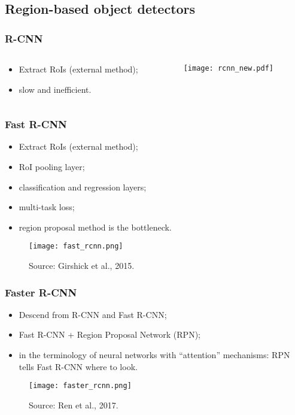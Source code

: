 \documentclass{beamer}
\begin{document}
		\subsection{Region-based object detectors}

		\begin{frame}\frametitle{R-CNN}
			\begin{columns}
				\begin{column}{0.5\textwidth}
					\begin{itemize}
						\item Extract RoIs (external method);
						\item slow and inefficient.
					\end{itemize}
				\end{column}
				\begin{column}{0.5\textwidth}
					\begin{figure}[th!]
						\centering
						\texttt{[image: rcnn\_new.pdf]}
						\label{fig:R-CNN}
					\end{figure}
				\end{column}
			\end{columns}
		\end{frame}



		\begin{frame}\frametitle{Fast R-CNN}
			\begin{itemize}
				\item Extract RoIs (external method);
				\item RoI pooling layer;
				\item classification and regression layers;
				\item multi-task loss;
				\item region proposal method is the bottleneck.
			\end{itemize}
			\begin{figure}[th!]
				\centering
				\texttt{[image: fast\_rcnn.png]}
				\caption{Source: {Girshick et al., 2015}.
				}
				\label{fig:Fast_R-CNN}
			\end{figure}
		\end{frame}


		\begin{frame}\frametitle{Faster R-CNN}
			\begin{itemize}
				\item Descend from R-CNN and Fast R-CNN;
				\item Fast R-CNN + Region Proposal Network (RPN);
				\item in the terminology of neural networks with “attention” mechanisms:
				RPN tells Fast R-CNN where to look.
			\end{itemize}
			\begin{figure}[th!]
				\centering
				\texttt{[image: faster\_rcnn.png]}
				\caption{Source: {Ren et al., 2017}.
				}
				\label{fig:Faster_R-CNN}
			\end{figure}
		\end{frame}
\end{document}

